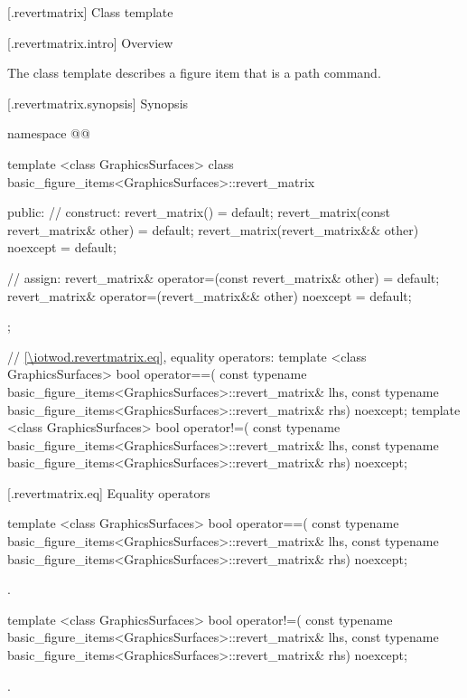  [\iotwod.revertmatrix] {Class template }

 [\iotwod.revertmatrix.intro] {Overview}

\pnum
{}
The class template  describes a figure item that is a path command.

 [\iotwod.revertmatrix.synopsis] {Synopsis}
\begin{codeblock}
namespace @\fullnamespace{}@ {
  template <class GraphicsSurfaces>
  class basic_figure_items<GraphicsSurfaces>::revert_matrix {
  public:
    // construct:
    revert_matrix() = default;
    revert_matrix(const revert_matrix& other) = default;
    revert_matrix(revert_matrix&& other) noexcept = default;

    // assign:
    revert_matrix& operator=(const revert_matrix& other) = default;
    revert_matrix& operator=(revert_matrix&& other) noexcept = default;
  };

  // \ref{\iotwod.revertmatrix.eq}, equality operators:
  template <class GraphicsSurfaces>
  bool operator==(
    const typename basic_figure_items<GraphicsSurfaces>::revert_matrix& lhs,
    const typename basic_figure_items<GraphicsSurfaces>::revert_matrix& rhs) 
    noexcept;  
  template <class GraphicsSurfaces>
  bool operator!=(
    const typename basic_figure_items<GraphicsSurfaces>::revert_matrix& lhs,
    const typename basic_figure_items<GraphicsSurfaces>::revert_matrix& rhs) 
    noexcept;
}
\end{codeblock}

 [\iotwod.revertmatrix.eq] {Equality operators}%

%
\begin{itemdecl}
template <class GraphicsSurfaces>
bool operator==(
  const typename basic_figure_items<GraphicsSurfaces>::revert_matrix& lhs,
  const typename basic_figure_items<GraphicsSurfaces>::revert_matrix& rhs)
  noexcept;
\end{itemdecl}
\begin{itemdescr}
\pnum
\returns {}.
\end{itemdescr}

%
\begin{itemdecl}
template <class GraphicsSurfaces>
bool operator!=(
  const typename basic_figure_items<GraphicsSurfaces>::revert_matrix& lhs,
  const typename basic_figure_items<GraphicsSurfaces>::revert_matrix& rhs)
  noexcept;
\end{itemdecl}
\begin{itemdescr}
\pnum
\returns {}.
\end{itemdescr}
